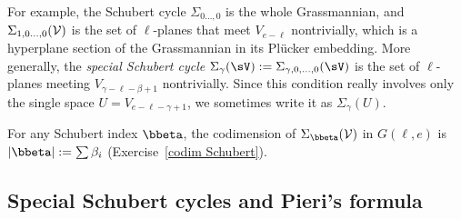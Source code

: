  
For example, the Schubert cycle $\Sigma_{0\dots,0}$ is the whole Grassmannian, 
and $\Sigma_{1,0\dots,0}(\cal V)$ is the set of $\ell$-planes that meet $V_{e-\ell}$ nontrivially, which is
a hyperplane section of the Grassmannian in its Pl\"ucker embedding. 
More generally, the
\emph{special Schubert cycle} 
$\Sigma_\gamma(\sV) := \Sigma_{\gamma,0,\dots, 0}(\sV)$ 
is the set of $\ell$-planes
meeting  $V_{\gamma-\ell - \beta+1}$ nontrivially.
Since this condition really involves only the single space $U = V_{e-\ell-\gamma+1}$, we sometimes 
 write it
as $\Sigma_\gamma(U)$. 

For any Schubert index $\bbeta$, the codimension of $\Sigma_{\bbeta}({\cal V})$ in $G(\ell, e)$ is $|{\bbeta}|:= \sum \beta_i$
(Exercise~\ref{codim Schubert}).

%



\begin{figure}
\begin{center}
\caption{}
\label{Schubert cycles and intersection product in G(2,4)}
\end{center}
\end{figure}

\subsection{Special Schubert cycles and Pieri's formula}

